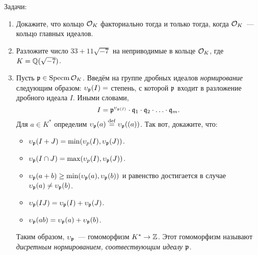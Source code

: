 	\begin{homework}
		Задачи: 
		\begin{enumerate}
			\item Докажите, что кольцо $\mathcal{O}_{K}$ факториально тогда и только тогда, когда $\mathcal{O}_{K}$~--- кольцо главных идеалов. 

			\item  Разложите число $33 + 11\sqrt{-7}$ на неприводимые в кольце $\mathcal{O}_{K}$, где $K = \mathbb{Q}(\sqrt{-7})$.

			\item Пусть $\mathfrak{p} \in \operatorname{Specm}{\mathcal{O}_{K}}$. Введём на группе дробных идеалов \emph{нормирование} следующим образом: $\upsilon_{\fp}\lr*{I} =$ степень, с которой $\mathfrak{p}$ входит в разложение дробного идеала $I$. Иными словами, 
			\[
				I = \mathfrak{p}^{\upsilon_{\mathfrak{p}(I)}} \cdot \mathfrak{q}_{1} \cdot  \mathfrak{q}_{2} \cdot \ldots \cdot \mathfrak{q}_{m}.
			\]
			Для $a \in K^{*}$ определим $\upsilon_{\mathfrak{p}}(a) \stackrel{\mathrm{def}}{=} \upsilon_{\mathfrak{p}}((a))$. Так вот, докажите, что:
			\begin{itemize}
				\item $\upsilon_{\fp}(I + J) = \min\lr*{\upsilon_{p}(I), \upsilon_{\fp}(J)}$.
				\item $\upsilon_{\fp}(I \cap J) = \max\lr*{\upsilon_{p}(I),\upsilon_{\fp}(J)}$.
				\item $\upsilon_{\fp}(a + b) \ge \min\lr*{\upsilon_{\fp}(a), \upsilon_{\fp}(b)}$ и равенство достигается в случае $\upsilon_{\mathfrak{p}}(a) \neq \upsilon_{\mathfrak{p}}(b)$.
				\item $\upsilon_{\mathfrak{p}}(IJ) = \upsilon_{\mathfrak{p}}(I) + \upsilon_{\mathfrak{p}}(J)$.
				\item $\upsilon_{\mathfrak{p}}(ab) = \upsilon_{\mathfrak{p}}(a) + \upsilon_{\mathfrak{p}}(b)$.

			\end{itemize}
			Таким образом, $\upsilon_{\mathfrak{p}}$~--- гомоморфизм $K^{*} \to \mathbb{Z}$. Этот гомоморфизм называют \emph{дисретным нормированием, соотвествующим идеалу $\mathfrak{p}$}.

		\end{enumerate}
	\end{homework}


	



	